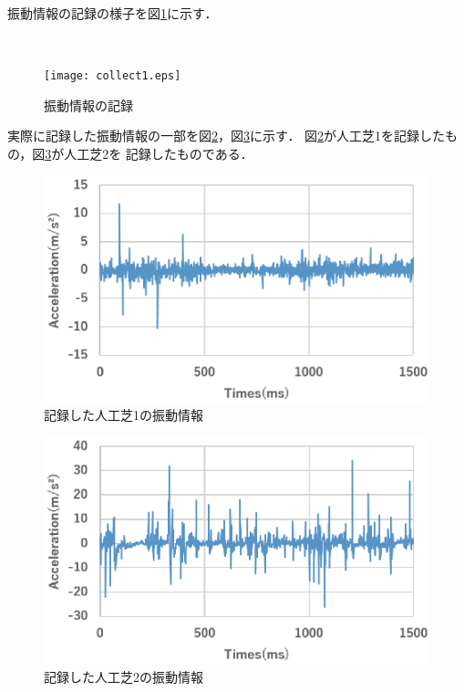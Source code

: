 振動情報の記録の様子を図\ref{4-1}に示す．

\begin{figure}[h]
　　\begin{center}
  \texttt{[image: collect1.eps]}
  \caption{振動情報の記録}
  \label{4-1}
\end{center}
\end{figure}



実際に記録した振動情報の一部を図\ref{4-5}，図\ref{4-6}に示す．
図\ref{4-5}が人工芝1を記録したもの，図\ref{4-6}が人工芝2を
記録したものである．
\begin{figure}[h]
\begin{center}
  \includegraphics[width=12cm]{grass1.eps}
  \caption{記録した人工芝1の振動情報}
  \label{4-5}
\end{center}
\end{figure}

\begin{figure}[h]
\begin{center}
  \includegraphics[width=12cm]{grass2.eps}
  \caption{記録した人工芝2の振動情報}
  \label{4-6}
\end{center}
\end{figure}
\newpage

